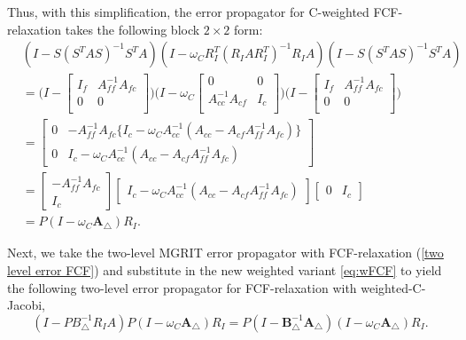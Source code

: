 \documentclass[VANCOUVER,STIX1COL]{WileyNJD-v2}
\begin{document}
Thus, with this simplification, the error propagator for C-weighted FCF-relaxation takes the following block $2 \times 2$ form:
\begin{subequations}
\begin{align} \label{eq:error propagator}
&(I-S(S^TAS)^{-1}S^TA)(I-\omega_C R^T_I(R_IAR^T_I)^{-1}R_IA)(I- S(S^TAS)^{-1}S^TA)\\%
& = \Bigg(I - \begin{bmatrix}
I_f & A_{ff}^{-1}A_{fc} \\
0 & 0\\
\end{bmatrix}\Bigg)
\Bigg(I - \omega_C \begin{bmatrix}
0 & 0 \\
A_{cc}^{-1}A_{cf} & I_c\\
\end{bmatrix}\Bigg)
\Bigg(I - \begin{bmatrix}
I_f & A_{ff}^{-1}A_{fc} \\
0 & 0\\
\end{bmatrix}\Bigg)\\%
& = \begin{bmatrix}
0 & -A_{ff}^{-1}A_{fc} \{I_c - \omega_C A_{cc}^{-1}(A_{cc} - A_{cf}A_{ff}^{-1}A_{fc})\}\\
0 & I_c - \omega_C A_{cc}^{-1} (A_{cc} - A_{cf}A_{ff}^{-1}A_{fc})
\end{bmatrix}\\
& = \begin{bmatrix}
- A_{ff}^{-1}A_{fc}\\
I_c
\end{bmatrix}
\begin{bmatrix}
I_c - \omega_C A_{cc}^{-1} (A_{cc} - A_{cf}A_{ff}^{-1}A_{fc})
\end{bmatrix}
\begin{bmatrix}
0 & I_c
\end{bmatrix}\\
& = P(I - \omega_C \mathbf{A}_{\triangle})R_I.
\label{eq:wFCF}
\end{align}
\end{subequations}

Next, we take the two-level MGRIT error propagator with FCF-relaxation (\ref{two level error FCF}) and 
substitute in the new weighted variant \eqref{eq:wFCF} to yield the following
two-level error propagator for FCF-relaxation with weighted-C-Jacobi,
\begin{equation} \label{eq:wJ_ep}
(I-PB^{-1}_{\triangle}R_IA)P(I - \omega_C \mathbf{A}_{\triangle})R_I = P(I-\mathbf{B}_{\triangle}^{-1}\mathbf{A}_{\triangle})(I - \omega_C \mathbf{A}_{\triangle})R_I .
\end{equation}
\end{document}
